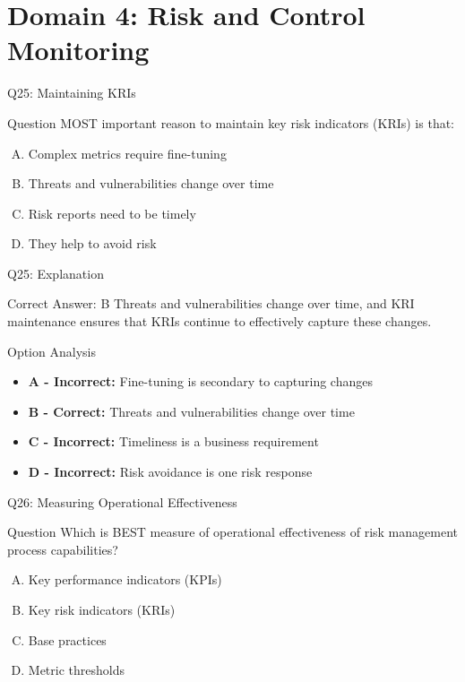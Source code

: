 \documentclass{beamer}
\begin{document}
	
	\section{Domain 4: Risk and Control Monitoring}
	
	\begin{frame}{Q25: Maintaining KRIs}
		\begin{block}{Question}
			MOST important reason to maintain key risk indicators (KRIs) is that:
		\end{block}
		\begin{enumerate}[(A)]
			\item Complex metrics require fine-tuning
			\item Threats and vulnerabilities change over time
			\item Risk reports need to be timely
			\item They help to avoid risk
		\end{enumerate}
	\end{frame}
	
	\begin{frame}{Q25: Explanation}
		\begin{block}{Correct Answer: B}
			Threats and vulnerabilities change over time, and KRI maintenance ensures that KRIs continue to effectively capture these changes.
		\end{block}
		\begin{block}{Option Analysis}
			\begin{itemize}
				\item \textbf{A - Incorrect:} Fine-tuning is secondary to capturing changes
				\item \textbf{B - Correct:} Threats and vulnerabilities change over time
				\item \textbf{C - Incorrect:} Timeliness is a business requirement
				\item \textbf{D - Incorrect:} Risk avoidance is one risk response
			\end{itemize}
		\end{block}
	\end{frame}
	
	\begin{frame}{Q26: Measuring Operational Effectiveness}
		\begin{block}{Question}
			Which is BEST measure of operational effectiveness of risk management process capabilities?
		\end{block}
		\begin{enumerate}[(A)]
			\item Key performance indicators (KPIs)
			\item Key risk indicators (KRIs)
			\item Base practices
			\item Metric thresholds
		\end{enumerate}
	\end{frame}
	
\end{document}
